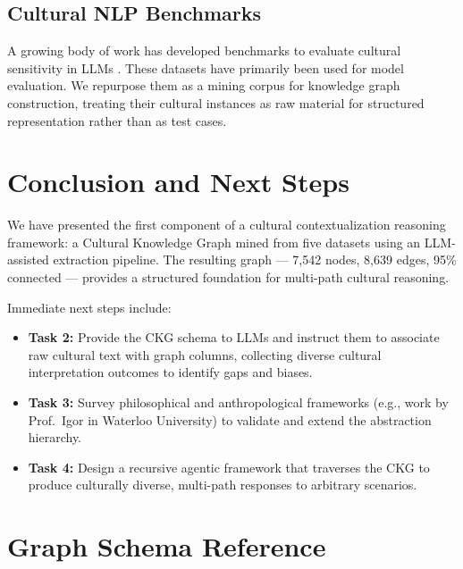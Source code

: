 \documentclass[11pt]{article}
\begin{document}
\subsection{Cultural NLP Benchmarks}

A growing body of work has developed benchmarks to evaluate cultural
sensitivity in LLMs
\cite{nguyen2023candle, sadallah2025arab, sahoo2025diwali,
shi2024culturebank, myung2024blend, choi2025kopiqa}.
These datasets have primarily been used for model evaluation.
We repurpose them as a mining corpus for knowledge graph construction,
treating their cultural instances as raw material for structured
representation rather than as test cases.

\section{Conclusion and Next Steps}
\label{sec:conclusion}

We have presented the first component of a cultural contextualization
reasoning framework: a Cultural Knowledge Graph mined from five datasets
using an LLM-assisted extraction pipeline.
The resulting graph — 7,542 nodes, 8,639 edges, 95\% connected —
provides a structured foundation for multi-path cultural reasoning.

Immediate next steps include:
\begin{itemize}
    \item \textbf{Task 2:} Provide the CKG schema to LLMs and instruct
    them to associate raw cultural text with graph columns, collecting
    diverse cultural interpretation outcomes to identify gaps and biases.
    \item \textbf{Task 3:} Survey philosophical and anthropological
    frameworks (e.g., work by Prof.\ Igor in Waterloo University) to
    validate and extend the abstraction hierarchy.
    \item \textbf{Task 4:} Design a recursive agentic framework that
    traverses the CKG to produce culturally diverse, multi-path
    responses to arbitrary scenarios.
\end{itemize}



\appendix
\section{Graph Schema Reference}
\end{document}
